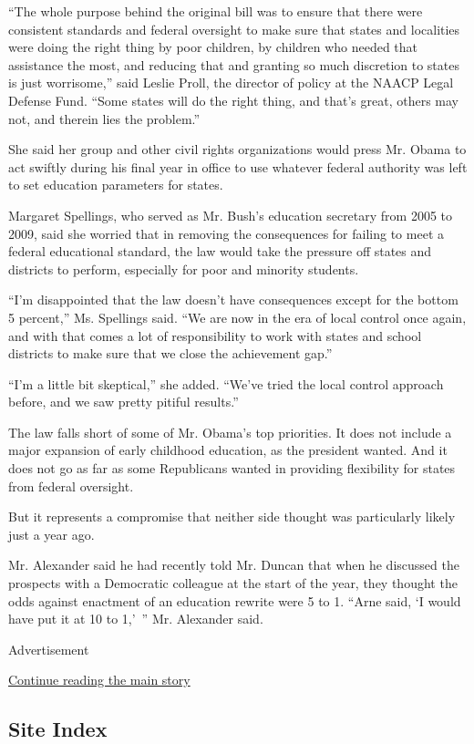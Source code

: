 ``The whole purpose behind the original bill was to ensure that there
were consistent standards and federal oversight to make sure that states
and localities were doing the right thing by poor children, by children
who needed that assistance the most, and reducing that and granting so
much discretion to states is just worrisome,'' said Leslie Proll, the
director of policy at the NAACP Legal Defense Fund. ``Some states will
do the right thing, and that's great, others may not, and therein lies
the problem.''

She said her group and other civil rights organizations would press Mr.
Obama to act swiftly during his final year in office to use whatever
federal authority was left to set education parameters for states.

Margaret Spellings, who served as Mr. Bush's education secretary from
2005 to 2009, said she worried that in removing the consequences for
failing to meet a federal educational standard, the law would take the
pressure off states and districts to perform, especially for poor and
minority students.

``I'm disappointed that the law doesn't have consequences except for the
bottom 5 percent,'' Ms. Spellings said. ``We are now in the era of local
control once again, and with that comes a lot of responsibility to work
with states and school districts to make sure that we close the
achievement gap.''

``I'm a little bit skeptical,'' she added. ``We've tried the local
control approach before, and we saw pretty pitiful results.''

The law falls short of some of Mr. Obama's top priorities. It does not
include a major expansion of early childhood education, as the president
wanted. And it does not go as far as some Republicans wanted in
providing flexibility for states from federal oversight.

But it represents a compromise that neither side thought was
particularly likely just a year ago.

Mr. Alexander said he had recently told Mr. Duncan that when he
discussed the prospects with a Democratic colleague at the start of the
year, they thought the odds against enactment of an education rewrite
were 5 to 1. ``Arne said, `I would have put it at 10 to 1,'~'' Mr.
Alexander said.

Advertisement

\protect\hyperlink{after-bottom}{Continue reading the main story}

\hypertarget{site-index}{%
\subsection{Site Index}\label{site-index}}

